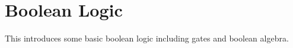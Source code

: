 \chapter{Boolean Logic}

This introduces some basic boolean logic including gates and boolean algebra.